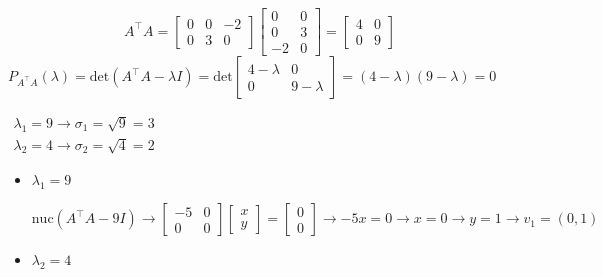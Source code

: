\begin{enumerate}[label=\color{red}\textbf{\arabic*)}]
\[
A^\intercal A=\begin{bmatrix} 
    0 & 0 & -2\\
    0 & 3 & 0
\end{bmatrix}\begin{bmatrix} 
    0 & 0\\ 0 & 3\\ -2 & 0 
\end{bmatrix}  =\begin{bmatrix} 
    4 & 0 \\
    0 & 9
\end{bmatrix} 
\] 
$P_{A^\intercal A}(\lambda)=\mathrm{det}(A^\intercal A-\lambda I)=\mathrm{det}\begin{bmatrix} 
    4-\lambda & 0\\
    0 & 9-\lambda
\end{bmatrix}=(4-\lambda)(9-\lambda)=0 $

$\begin{array}{l}
    \lambda_1=9\longrightarrow \sigma_1=\sqrt{9} =3\\
    \lambda_2=4\longrightarrow \sigma_2=\sqrt{4} =2
\end{array}$ 
\begin{itemize}[label=\textbullet]
    \item $\lambda_1=9$

        $\mathrm{nuc}(A^\intercal A-9I)\longrightarrow \begin{bmatrix} 
            -5 & 0\\
            0 & 0
        \end{bmatrix}\begin{bmatrix} 
        x\\ y 
        \end{bmatrix}=\begin{bmatrix} 
        0\\ 0 
        \end{bmatrix}\longrightarrow -5x=0\longrightarrow x=0\longrightarrow y=1\longrightarrow v_1=(0,1)$

    \item $\lambda_2=4$


\end{itemize}
\end{enumerate}
